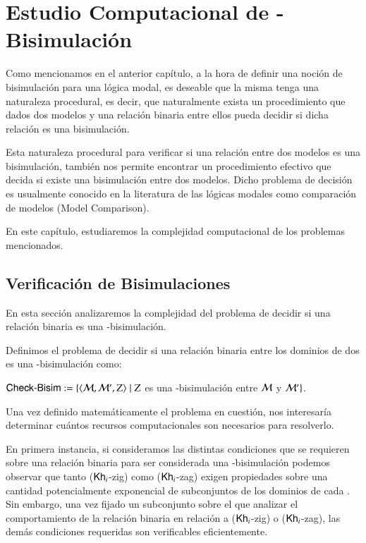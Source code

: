 \chapter{Estudio Computacional de \KHilogic-Bisimulación}

Como mencionamos en el anterior capítulo, a la hora de definir una noción de bisimulación para una lógica modal, 
es deseable que la misma tenga una naturaleza procedural, es decir, que naturalmente exista un procedimiento que dados dos
modelos y una relación binaria entre ellos pueda decidir si dicha relación es una bisimulación.

Esta naturaleza procedural para verificar si una relación entre dos modelos es una bisimulación,
también nos permite encontrar un procedimiento efectivo que decida si existe una bisimulación entre dos modelos. 
Dicho problema de decisión es usualmente conocido en la literatura de las lógicas modales como comparación de modelos (Model Comparison).

En este capítulo, estudiaremos la complejidad computacional de los problemas mencionados.

\section{Verificación de Bisimulaciones}

En esta sección analizaremos la complejidad del problema de decidir si una relación binaria es una \KHilogic-bisimulación.  

\begin{definicion}
    Definimos el problema de decidir si una relación binaria entre los dominios de dos \ults es una \KHilogic-bisimulación como:
    \begin{center}
        $\rm\textsf{Check-Bisim} := \{\langle \mathcal{M},\mathcal{M}',Z \rangle \mid Z$ es una \KHilogic-bisimulación entre $\mathcal{M}$ y $\mathcal{M}'\}$.
    \end{center}
\end{definicion}

Una vez definido matemáticamente el problema en cuestión, nos interesaría determinar cuántos recursos computacionales son necesarios 
para resolverlo.

En primera instancia, si consideramos las distintas condiciones que se requieren sobre una relación binaria para ser considerada una 
\KHilogic-bisimulación podemos observar que tanto ($\mathsf{Kh}_i$-zig) como ($\mathsf{Kh}_i$-zag) exigen propiedades sobre una cantidad potencialmente 
exponencial de subconjuntos de los dominios de cada \ults. Sin embargo, una vez fijado un subconjunto sobre el que analizar el  
comportamiento de la relación binaria en relación a ($\mathsf{Kh}_i$-zig) o ($\mathsf{Kh}_i$-zag), las demás condiciones requeridas son verificables 
eficientemente.

